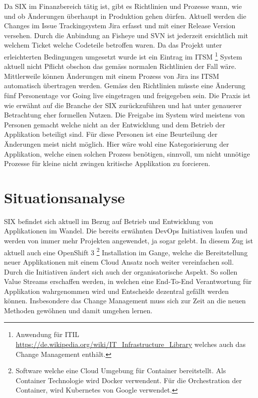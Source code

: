 Da SIX im Finanzbereich tätig ist, gibt es Richtlinien und Prozesse wann, wie und ob Änderungen überhaupt in Produktion gehen dürfen. Aktuell werden die Changes im Issue Trackingsystem Jira erfasst und mit einer Release Version versehen. Durch die Anbindung an Fisheye und SVN ist jederzeit ersichtlich mit welchem Ticket welche Codeteile betroffen waren. Da das Projekt unter erleichterten Bedingungen umgesetzt wurde ist ein Eintrag im ITSM \footnote{Anwendung für ITIL \url{https://de.wikipedia.org/wiki/IT_Infrastructure_Library} welches auch das Change Management enthält.} System aktuell nicht Pflicht obschon das gemäss normalen Richtlinien der Fall wäre. Mittlerweile können Änderungen mit einem Prozess von Jira ins ITSM automatisch übertragen werden.
Gemäss den Richtlinien müsste eine Änderung fünf Personentage vor Going live eingetragen und freigegeben sein. Die Praxis ist wie erwähnt auf die Branche der SIX zurückzuführen und hat unter genauerer Betrachtung eher formellen Nutzen. Die Freigabe im System wird meistens von Personen gemacht welche nicht an der Entwicklung und dem Betrieb der Applikation beteiligt sind. Für diese Personen ist eine Beurteilung der Änderungen meist nicht möglich. Hier wäre wohl eine Kategorisierung der Applikation, welche einen solchen Prozess benötigen, sinnvoll, um nicht unnötige Prozesse für kleine nicht zwingen kritische Applikation zu forcieren.

\section{Situationsanalyse}

SIX befindet sich aktuell im Bezug auf Betrieb und Entwicklung von Applikationen im Wandel. Die bereits erwähnten DevOps Initiativen laufen und werden von immer mehr Projekten angewendet, ja sogar gelebt. In diesem Zug ist aktuell auch eine OpenShift 3 \footnote{Software welche eine Cloud Umgebung für Container bereitstellt. Als Container Technologie wird Docker verwendent. Für die Orchestration der Container, wird Kubernetes von Google verwendet.} Installation im Gange, welche die Bereitstellung neuer Applikationen mit einem Cloud Ansatz noch weiter vereinfachen soll.
Durch die Initiativen ändert sich auch der organisatorische Aspekt. So sollen Value Streams erschaffen werden, in welchen eine End-To-End Verantwortung für Applikation wahrgenommen wird und Entscheide dezentral gefällt werden können. Insbesondere das Change Management muss sich zur Zeit an die neuen Methoden gewöhnen und damit umgehen lernen.

